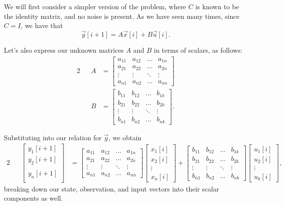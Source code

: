 \documentclass[letterpaper]{article}
\theoremstyle{remark}
\newcommand{\mat}[1]{\ensuremath{\begin{bmatrix}#1\end{bmatrix}}}
\newcommand{\eqn}[1]{\begin{alignat*}{2}#1\end{alignat*}}
\begin{document}
We will first consider a simpler version of the problem, where $C$ is known to be the identity matrix, and no noise is present. As we have seen many times, since $C=I$, we have that
\[
    \vec{y}[i + 1] = A\vec{x}[i] + B\vec{u}[i].
\]

Let's also express our unknown matrices $A$ and $B$ in terms of scalars, as follows:
\eqn{
    && A &= \mat{
    a_{11} & a_{12} & \ldots & a_{1n} \\
    a_{21} & a_{22} & \ldots & a_{2n} \\
    \vdots & \vdots & \ddots & \vdots \\
    a_{n1} & a_{n2} & \ldots & a_{nn}} \\
    && B &= \mat{
    b_{11} & b_{12} & \ldots & b_{1k} \\
    b_{21} & b_{22} & \ldots & b_{2k} \\
    \vdots & \vdots & \ddots & \vdots \\
    b_{n1} & b_{n2} & \ldots & b_{nk}}.
}

Substituting into our relation for $\vec{y}$, we obtain
\eqn{
    && \mat{
        y_1[i+1] \\
        y_2[i+1] \\
         \\
        y_n[i+1] \\
    } &= \mat{
    a_{11} & a_{12} & \ldots & a_{1n} \\
    a_{21} & a_{22} & \ldots & a_{2n} \\
    \vdots & \vdots & \ddots & \vdots \\
    a_{n1} & a_{n2} & \ldots & a_{nn}}
    \mat{
        x_1[i] \\
        x_2[i] \\
        \vdots \\
        x_n[i]
    } + \mat{
    b_{11} & b_{12} & \ldots & b_{1k} \\
    b_{21} & b_{22} & \ldots & b_{2k} \\
    \vdots & \vdots & \ddots & \vdots \\
    b_{n1} & b_{n2} & \ldots & b_{nk}} 
    \mat{
        u_1[i] \\
        u_2[i] \\
        \vdots \\
        u_k[i]
    },
}
breaking down our state, observation, and input vectors into their scalar components as well.
\end{document}
